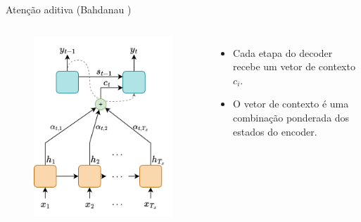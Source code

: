 \documentclass{beamer}
\begin{document}
\begin{frame}{Atenção aditiva (Bahdanau \cite{bahdanau2014neural})}
	\begin{columns}[t]
		\vspace{-8mm}
		\begin{figure}[h]
			\centering
			\includegraphics[height=0.55\textheight]{assets/Bahdanau-Decoder.png}
		\end{figure}
		\vspace{-3mm}
		\small
		\begin{itemize}
			\item Cada etapa do decoder recebe um vetor de contexto $c_i$.
			\item O vetor de contexto é uma combinação ponderada dos estados do encoder.
		\end{itemize}


\end{columns}
\end{frame}
\end{document}

